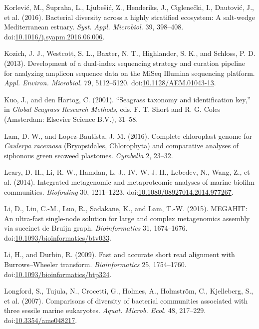 \documentclass[12pt,]{article}
\begin{document}
\leavevmode\hypertarget{ref-Korlevic2016}{}%
Korlević, M., Šupraha, L., Ljubešić, Z., Henderiks, J., Ciglenečki, I.,
Dautović, J., et al. (2016). Bacterial diversity across a highly
stratified ecosystem: A salt-wedge Mediterranean estuary. \emph{Syst.
Appl. Microbiol.} 39, 398--408.
doi:\href{https://doi.org/10.1016/j.syapm.2016.06.006}{10.1016/j.syapm.2016.06.006}.

\leavevmode\hypertarget{ref-Kozich2013}{}%
Kozich, J. J., Westcott, S. L., Baxter, N. T., Highlander, S. K., and
Schloss, P. D. (2013). Development of a dual-index sequencing strategy
and curation pipeline for analyzing amplicon sequence data on the MiSeq
Illumina sequencing platform. \emph{Appl. Environ. Microbiol.} 79,
5112--5120.
doi:\href{https://doi.org/10.1128/AEM.01043-13}{10.1128/AEM.01043-13}.

\leavevmode\hypertarget{ref-Kuo2001}{}%
Kuo, J., and den Hartog, C. (2001). ``Seagrass taxonomy and
identification key,'' in \emph{Global Seagrass Research Methods}, eds.
F. T. Short and R. G. Coles (Amsterdam: Elsevier Science B.V.), 31--58.

\leavevmode\hypertarget{ref-Lam2016}{}%
Lam, D. W., and Lopez-Bautista, J. M. (2016). Complete chloroplast
genome for \emph{Caulerpa racemosa} (Bryopsidales, Chlorophyta) and
comparative analyses of siphonous green seaweed plastomes.
\emph{Cymbella} 2, 23--32.

\leavevmode\hypertarget{ref-Leary2014}{}%
Leary, D. H., Li, R. W., Hamdan, L. J., IV, W. J. H., Lebedev, N., Wang,
Z., et al. (2014). Integrated metagenomic and metaproteomic analyses of
marine biofilm communities. \emph{Biofouling} 30, 1211--1223.
doi:\href{https://doi.org/10.1080/08927014.2014.977267}{10.1080/08927014.2014.977267}.

\leavevmode\hypertarget{ref-Li2015}{}%
Li, D., Liu, C.-M., Luo, R., Sadakane, K., and Lam, T.-W. (2015).
MEGAHIT: An ultra-fast single-node solution for large and complex
metagenomics assembly via succinct de Bruijn graph.
\emph{Bioinformatics} 31, 1674--1676.
doi:\href{https://doi.org/10.1093/bioinformatics/btv033}{10.1093/bioinformatics/btv033}.

\leavevmode\hypertarget{ref-Li2009a}{}%
Li, H., and Durbin, R. (2009). Fast and accurate short read alignment
with Burrows--Wheeler transform. \emph{Bioinformatics} 25, 1754--1760.
doi:\href{https://doi.org/10.1093/bioinformatics/btp324}{10.1093/bioinformatics/btp324}.

\leavevmode\hypertarget{ref-Longford2007}{}%
Longford, S., Tujula, N., Crocetti, G., Holmes, A., Holmström, C.,
Kjelleberg, S., et al. (2007). Comparisons of diversity of bacterial
communities associated with three sessile marine eukaryotes.
\emph{Aquat. Microb. Ecol.} 48, 217--229.
doi:\href{https://doi.org/10.3354/ame048217}{10.3354/ame048217}.
\end{document}
